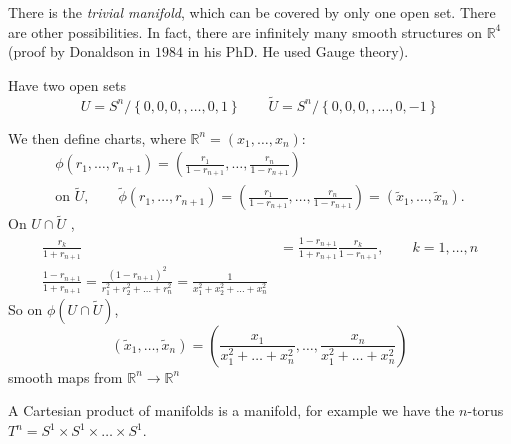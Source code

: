 \begin{example}[$M = \mathbb{R}^n$]
  There is the \emph{trivial manifold}, which can be covered by only one open set.
  There are other possibilities. In fact, there are infinitely many smooth structures on $\mathbb{R}^4$ (proof by Donaldson in $1984$ in his PhD. He used Gauge theory).
\end{example}
\begin{example}[sphere $S^n = \left\{ \vb{r} \in \mathbb{R}^{n + 1}, \abs{\vb{r}} = 1 \right\}$ ]
  Have two open sets 
  \begin{equation}
    U = S^n / \left\{ 0,0,0,, \dots, 0, 1 \right\} \qquad
    \widetilde{U} = S^n / \left\{ 0,0,0,, \dots, 0, - 1 \right\}
  \end{equation}
  \begin{figure}[tbhp]
    \centering
    \def\svgwidth{0.4\columnwidth}
    
    \caption{}
    \label{fig:l1f5}
  \end{figure}
  We then define charts, where $\mathbb{R}^n = (x_1, \dots, x_n)$:
  \begin{equation}
    \begin{gathered}
      \phi(r_1, \dots, r_{n+1}) = \left( \frac{r_1}{1 - r_{n+1}}, \dots, \frac{r_n}{1-r_{n+1}} \right) \\
      \text{on } \widetilde{U}, \qquad \widetilde{\phi}(r_1, \dots, r_{n+1}) = \left( \frac{r_1}{1 - r_{n+1}}, \dots, \frac{r_n}{1-r_{n+1}} \right) = (\widetilde{x}_1 , \dots, \widetilde{x}_n).
    \end{gathered}
  \end{equation}
  On $U \cap \widetilde{U}$ , 
  \begin{align}
    \frac{r_k}{1 + r_{n+1}} &= \frac{1 - r_{n+1}}{1 + r_{n+1}} \frac{r_k}{1 - r_{n+1}}, \qquad k = 1, \dots, n \\
    \frac{1 - r_{n+1}}{1 + r_{n+1}} = \frac{(1 - r_{n+1})^2}{r^2_1 + r^2_2 + \dots + r^2_n} = \frac{1}{x^2_1 + x^2_2 + \dots + x^2_n}
  \end{align}
  So on $\phi(U \cap \widetilde{U})$,
  \begin{equation}
    (\widetilde{x}_1, \dots, \widetilde{x}_n) = \left( \frac{x_1}{x^2_1 + \dots + x^2_n}, \dots, \frac{x_n}{x^2_1 + \dots + x^2_n} \right)
  \end{equation}
  smooth maps from $\mathbb{R}^n \to \mathbb{R}^n$
\end{example}
\begin{example}[]
  A Cartesian product of manifolds is a manifold, for example we have the $n$-torus $T^n = S^1 \times S^1 \times \dots \times S^1$.
\end{example}
